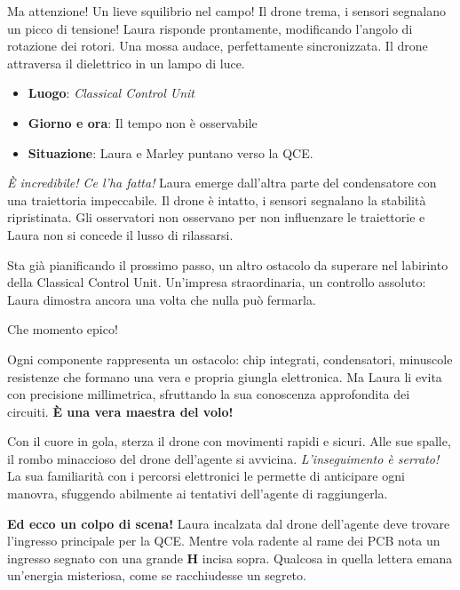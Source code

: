 Ma attenzione! Un lieve squilibrio nel campo! Il drone trema, i sensori segnalano un picco di tensione! Laura risponde prontamente, modificando l’angolo di rotazione dei rotori. Una mossa audace, perfettamente sincronizzata. Il drone attraversa il dielettrico in un lampo di luce.


\begin{tcolorbox}[colback=gray!5,colframe=gray!80,title=\textbf{Scheda Informativa}]
\begin{itemize}
    \item \textbf{Luogo}: \emph{Classical Control Unit}
    \item \textbf{Giorno e ora}: Il tempo non è osservabile
    \item \textbf{Situazione}: Laura e Marley puntano verso la QCE.
\end{itemize}
\end{tcolorbox}


\textit{È incredibile! Ce l'ha fatta!} Laura emerge dall’altra parte del condensatore con una traiettoria impeccabile. Il drone è intatto, i sensori segnalano la stabilità ripristinata. Gli osservatori non osservano per non influenzare le traiettorie e Laura non si concede il lusso di rilassarsi.

Sta già pianificando il prossimo passo, un altro ostacolo da superare nel labirinto della Classical Control Unit. Un’impresa straordinaria, un controllo assoluto: Laura dimostra ancora una volta che nulla può fermarla.

Che momento epico!


Ogni componente rappresenta un ostacolo: chip integrati, condensatori, minuscole resistenze che formano una vera e propria giungla elettronica. Ma Laura li evita con precisione millimetrica, sfruttando la sua conoscenza approfondita dei circuiti. \textbf{È una vera maestra del volo!}

Con il cuore in gola, sterza il drone con movimenti rapidi e sicuri. Alle sue spalle, il rombo minaccioso del drone dell'agente si avvicina. \emph{L'inseguimento è serrato!} La sua familiarità con i percorsi elettronici le permette di anticipare ogni manovra, sfuggendo abilmente ai tentativi dell'agente di raggiungerla.

\textbf{Ed ecco un colpo di scena!} Laura incalzata dal drone dell'agente deve trovare l'ingresso principale per la QCE. Mentre vola radente al rame dei PCB nota un ingresso segnato con una grande \textbf{H} incisa sopra. Qualcosa in quella lettera emana un'energia misteriosa, come se racchiudesse un segreto.

